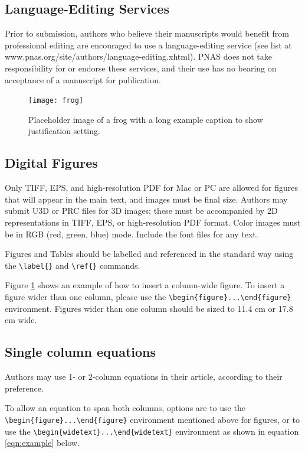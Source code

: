 \documentclass[9pt,twocolumn,twoside,lineno]{pnas-new}
\begin{document}
\subsection*{Language-Editing Services}
Prior to submission, authors who believe their manuscripts would benefit from professional editing are encouraged to use a language-editing service (see list at www.pnas.org/site/authors/language-editing.xhtml). PNAS does not take responsibility for or endorse these services, and their use has no bearing on acceptance of a manuscript for publication.

\begin{figure}%
\centering
\texttt{[image: frog]}
\caption{Placeholder image of a frog with a long example caption to show justification setting.}
\label{fig:frog}
\end{figure}

\subsection*{Digital Figures}
\label{sec:figures}

Only TIFF, EPS, and high-resolution PDF for Mac or PC are allowed for figures that will appear in the main text, and images must be final size. Authors may submit U3D or PRC files for 3D images; these must be accompanied by 2D representations in TIFF, EPS, or high-resolution PDF format.  Color images must be in RGB (red, green, blue) mode. Include the font files for any text.

Figures and Tables should be labelled and referenced in the standard way using the \verb|\label{}| and \verb|\ref{}| commands.

Figure \ref{fig:frog} shows an example of how to insert a column-wide figure. To insert a figure wider than one column, please use the \verb|\begin{figure}...\end{figure}| environment. Figures wider than one column should be sized to 11.4 cm or 17.8 cm wide.

\subsection*{Single column equations}

Authors may use 1- or 2-column equations in their article, according to their preference.

To allow an equation to span both columns, options are to use the \verb|\begin{figure}...\end{figure}| environment mentioned above for figures, or to use the \verb|\begin{widetext}...\end{widetext}| environment as shown in equation \ref{eqn:example} below.
\end{document}
